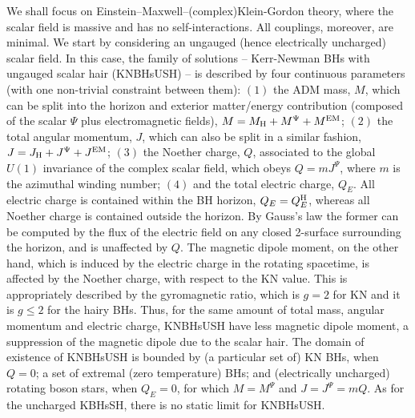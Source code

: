 We shall focus on Einstein--Maxwell--(complex)Klein-Gordon theory, where the scalar field is massive and has no self-interactions. All couplings, moreover, are minimal. We start by considering an ungauged (hence electrically uncharged) scalar field. In this case, the family of solutions -- Kerr-Newman BHs with ungauged scalar hair (KNBHsUSH) -- is described by four continuous parameters (with one non-trivial constraint between them): $(1)$ the ADM mass, $M$, which can be split into the horizon and exterior matter/energy contribution (composed of the scalar $\Psi$ plus electromagnetic fields), $M=M_{\rm H}+M^\Psi+M^{\rm EM}$; $(2)$ the total angular momentum, $J$, which can also be split in a similar fashion, $J=J_{\rm H}+J^\Psi+J^{\rm EM}$; $(3)$ the  Noether charge, $Q$, associated to the global $U(1)$ invariance of the complex scalar field, which obeys $Q=mJ^\Psi$, where $m$ is the azimuthal winding number; $(4)$ and the total electric charge, $Q_E$. All electric charge is contained within the BH horizon, $Q_E=Q_E^{\rm H}$, whereas all Noether charge is contained outside the horizon. By Gauss's law the former can be computed by the flux of the electric field on any closed 2-surface surrounding the horizon, and is unaffected by $Q$. The magnetic dipole moment, on the other hand, which is induced by the electric charge in the rotating spacetime, is affected by the Noether charge, with respect  to the KN value. This is appropriately described by the gyromagnetic ratio, which is $g=2$ for KN and it is $g\leqslant 2$ for the hairy BHs. Thus, for the same amount of total mass, angular momentum and electric charge, KNBHsUSH have less magnetic dipole moment, a suppression of the magnetic dipole due to the scalar hair. The domain of existence of KNBHsUSH is bounded by (a particular set of) KN BHs, when $Q=0$; a set of extremal (zero temperature) BHs; and (electrically uncharged) rotating boson stars, when $Q_E=0$, for which $M=M^\Psi$ and $J=J^\Psi=mQ$.  As for the uncharged KBHsSH, there is no static limit for KNBHsUSH.

\bigskip

